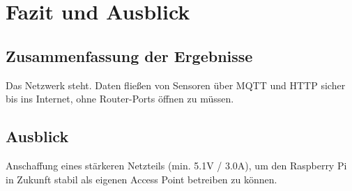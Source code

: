 \chapter{Fazit und Ausblick}

\section{Zusammenfassung der Ergebnisse}
Das Netzwerk steht. Daten fließen von Sensoren über MQTT und HTTP sicher bis ins Internet, ohne Router-Ports öffnen zu müssen.

\section{Ausblick}
Anschaffung eines stärkeren Netzteils (min. 5.1V / 3.0A), um den Raspberry Pi in Zukunft stabil als eigenen Access Point betreiben zu können.